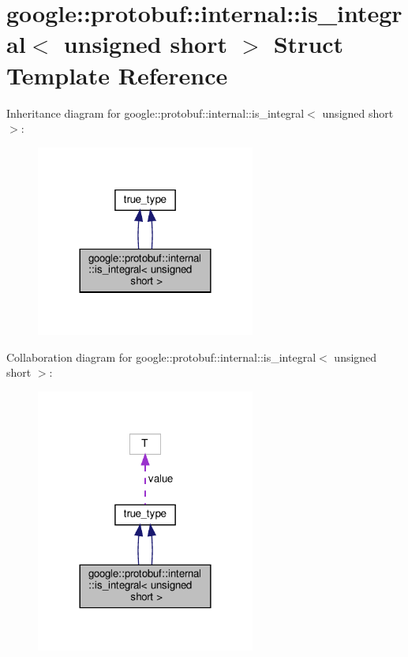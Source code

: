 \hypertarget{structgoogle_1_1protobuf_1_1internal_1_1is__integral_3_01unsigned_01short_01_4}{}\section{google\+:\+:protobuf\+:\+:internal\+:\+:is\+\_\+integral$<$ unsigned short $>$ Struct Template Reference}
\label{structgoogle_1_1protobuf_1_1internal_1_1is__integral_3_01unsigned_01short_01_4}


Inheritance diagram for google\+:\+:protobuf\+:\+:internal\+:\+:is\+\_\+integral$<$ unsigned short $>$\+:
\nopagebreak
\begin{figure}[H]
\begin{center}
\leavevmode
\includegraphics[width=204pt]{structgoogle_1_1protobuf_1_1internal_1_1is__integral_3_01unsigned_01short_01_4__inherit__graph}
\end{center}
\end{figure}


Collaboration diagram for google\+:\+:protobuf\+:\+:internal\+:\+:is\+\_\+integral$<$ unsigned short $>$\+:
\nopagebreak
\begin{figure}[H]
\begin{center}
\leavevmode
\includegraphics[width=204pt]{structgoogle_1_1protobuf_1_1internal_1_1is__integral_3_01unsigned_01short_01_4__coll__graph}
\end{center}
\end{figure}

